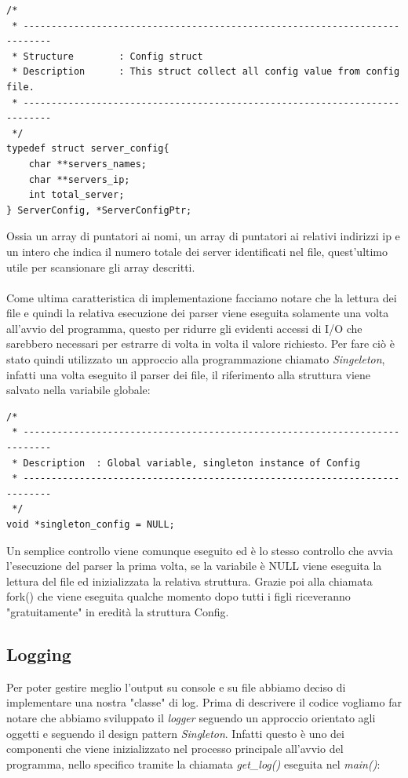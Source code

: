 \documentclass[italian]{tktltiki2}
\begin{document}
\begin{lstlisting}
/*
 * ---------------------------------------------------------------------------
 * Structure        : Config struct
 * Description      : This struct collect all config value from config file.
 * ---------------------------------------------------------------------------
 */
typedef struct server_config{
    char **servers_names;
    char **servers_ip;
    int total_server;
} ServerConfig, *ServerConfigPtr;
\end{lstlisting}
Ossia un array di puntatori ai nomi, un array di puntatori ai relativi indirizzi ip e un intero che indica il numero totale dei server identificati nel file, quest'ultimo utile per scansionare gli array descritti.
\\\\Come ultima caratteristica di implementazione facciamo notare che la lettura dei file e quindi la relativa esecuzione dei parser viene eseguita solamente una volta all'avvio del programma, questo per ridurre gli evidenti accessi di I/O che sarebbero necessari per estrarre di volta in volta il valore richiesto. Per fare ciò è stato quindi utilizzato un approccio alla programmazione chiamato \emph{Singeleton}, infatti una volta eseguito il parser dei file, il riferimento alla struttura viene salvato nella variabile globale:

\begin{lstlisting}
/*
 * ---------------------------------------------------------------------------
 * Description  : Global variable, singleton instance of Config
 * ---------------------------------------------------------------------------
 */
void *singleton_config = NULL;
\end{lstlisting}
Un semplice controllo viene comunque eseguito ed è lo stesso controllo che avvia l'esecuzione del parser la prima volta, se la variabile è NULL viene eseguita la lettura del file ed inizializzata la relativa struttura. Grazie poi alla chiamata fork() che viene eseguita qualche momento dopo tutti i figli riceveranno "gratuitamente" in eredità la struttura Config.

\subsection{Logging}
\label{ssec:logging}
Per poter gestire meglio l'output su console e su file abbiamo deciso di implementare una nostra "classe" di log. Prima di descrivere il codice vogliamo far notare che abbiamo sviluppato il \emph{logger} seguendo un approccio orientato agli oggetti e seguendo il design pattern \emph{Singleton}. Infatti questo è uno dei componenti che viene inizializzato nel processo principale all'avvio del programma, nello specifico tramite la chiamata \emph{get\_log()} eseguita nel \emph{main()}:
\end{document}
